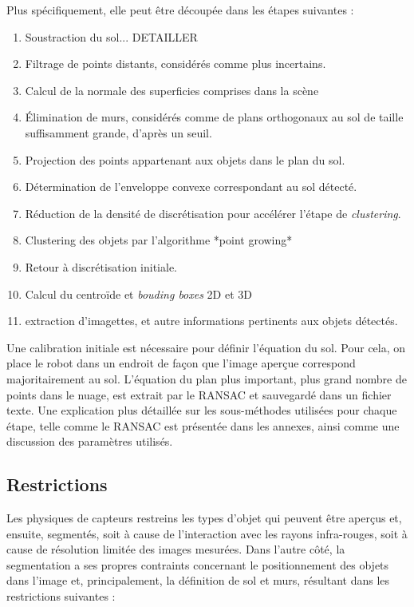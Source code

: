 Plus spécifiquement, elle peut être découpée dans les étapes suivantes
:

\begin{enumerate}
\item Soustraction du sol... {\color{blue} DETAILLER}

\item Filtrage de points distants, considérés comme plus incertains.

\item Calcul de la normale des superficies comprises dans la scène

\item Élimination de murs, considérés comme de plans orthogonaux au
  sol de taille suffisamment grande, d'après un seuil.

\item Projection des points appartenant aux objets dans le plan du
  sol.

\item Détermination de l’enveloppe convexe correspondant au sol détecté.

\item Réduction de la densité de discrétisation pour accélérer l'étape
  de \textit{clustering}.

\item Clustering des objets par l'algorithme *point growing*

\item Retour à discrétisation initiale.

\item Calcul du centroïde et \textit{bouding boxes} 2D et 3D

\item extraction d’imagettes, et autre informations pertinents aux
  objets détectés.
\end{enumerate}

Une calibration initiale est nécessaire pour définir l'équation du
sol. Pour cela, on place le robot dans un endroit de façon que l'image
aperçue correspond majoritairement au sol. L’équation du plan plus
important, plus grand nombre de points dans le nuage, est extrait par
le RANSAC et sauvegardé dans un fichier texte. Une explication plus
détaillée sur les sous-méthodes utilisées pour chaque étape, telle
comme le RANSAC est présentée dans les annexes, ainsi comme une
discussion des paramètres utilisés.

\subsection{Restrictions} Les physiques de capteurs restreins les
types d'objet qui peuvent être aperçus et, ensuite, segmentés, soit à
cause de l'interaction avec les rayons infra-rouges, soit à cause de
résolution limitée des images mesurées. Dans l'autre côté, la
segmentation a ses propres contraints concernant le positionnement des
objets dans l'image et, principalement, la définition de sol et murs,
résultant dans les restrictions suivantes :


